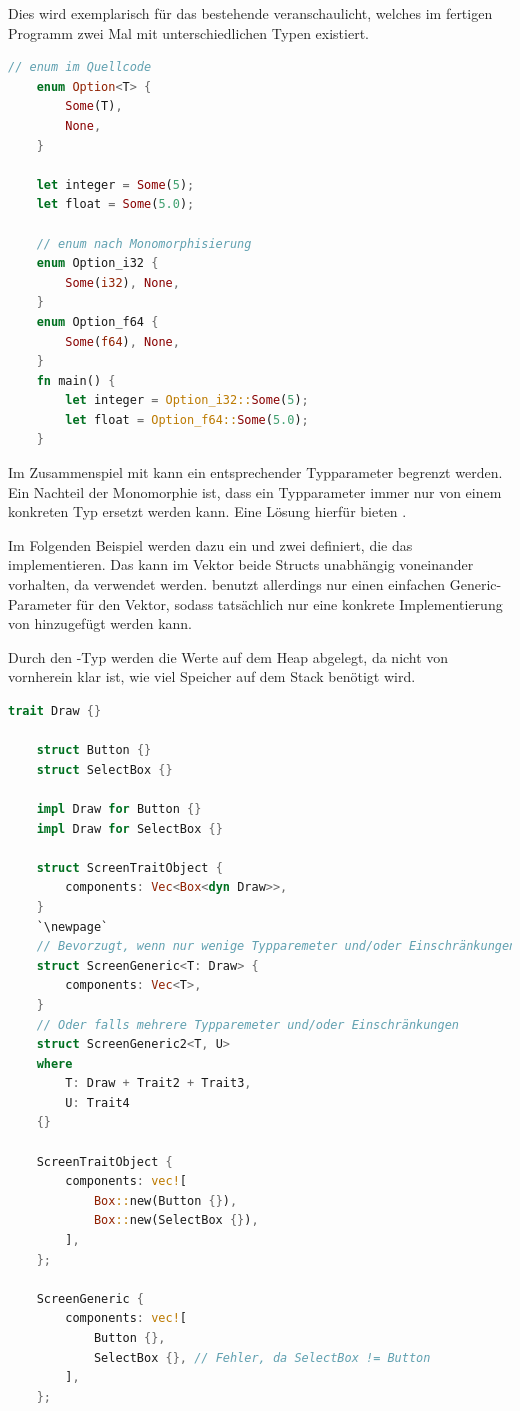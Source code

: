 \documentclass[11pt,a4paper, ngerman]{article}
\begin{document}
Dies wird exemplarisch für das bestehende   veranschaulicht, welches im fertigen Programm zwei Mal mit unterschiedlichen Typen existiert.

\begin{lstlisting}[language=rust, caption={Veranschaulichung der Monomorphisierung \cite{MonoCodeEx}}]
    // enum im Quellcode
    enum Option<T> {
        Some(T),
        None,
    }

    let integer = Some(5);
    let float = Some(5.0);
    
    // enum nach Monomorphisierung
    enum Option_i32 {
        Some(i32), None,
    }
    enum Option_f64 {
        Some(f64), None,
    }
    fn main() {
        let integer = Option_i32::Some(5);
        let float = Option_f64::Some(5.0);
    }
\end{lstlisting}

Im Zusammenspiel mit  kann ein entsprechender Typparameter begrenzt werden. Ein Nachteil der Monomorphie ist, dass ein Typparameter immer nur von einem konkreten Typ ersetzt werden kann. Eine Lösung hierfür bieten .

Im Folgenden Beispiel werden dazu ein  und zwei  definiert, die das  implementieren. Das  kann im Vektor  beide Structs unabhängig voneinander vorhalten, da  verwendet werden.  benutzt allerdings nur einen einfachen Generic-Parameter für den Vektor, sodass tatsächlich nur eine konkrete Implementierung von  hinzugefügt werden kann.

\label{sec:BoxType}
Durch den -Typ werden die Werte auf dem Heap abgelegt, da nicht von vornherein klar ist, wie viel Speicher auf dem Stack benötigt wird.

\begin{lstlisting}[language=rust, caption={Trait Boundaries \cite{TraitBoundariesEx}}]
    trait Draw {}

    struct Button {}
    struct SelectBox {}

    impl Draw for Button {}
    impl Draw for SelectBox {}

    struct ScreenTraitObject {
        components: Vec<Box<dyn Draw>>,
    }
    `\newpage`
    // Bevorzugt, wenn nur wenige Typparemeter und/oder Einschränkungen
    struct ScreenGeneric<T: Draw> {
        components: Vec<T>,
    }
    // Oder falls mehrere Typparemeter und/oder Einschränkungen
    struct ScreenGeneric2<T, U>
    where
        T: Draw + Trait2 + Trait3,
        U: Trait4
    {}

    ScreenTraitObject {
        components: vec![
            Box::new(Button {}),
            Box::new(SelectBox {}),
        ],
    };

    ScreenGeneric {
        components: vec![
            Button {},
            SelectBox {}, // Fehler, da SelectBox != Button
        ],
    };
\end{lstlisting}
\end{document}

